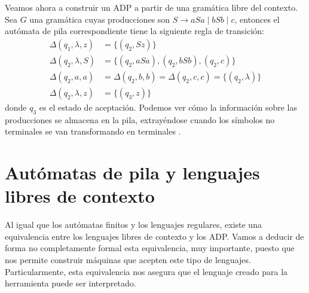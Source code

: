 \vspace{10pt}
Veamos ahora a construir un ADP a partir de una gramática libre del contexto. Sea $G$ una gramática cuyas producciones 
son $S\to aSa\mid bSb\mid c$, entonces el autómata de pila correspondiente tiene la siguiente regla de transición:
\begin{align}
    \Delta(q_1,\lambda,z)&=\{(q_2,Sz)\} \\
    \Delta(q_2,\lambda,S)&=\{(q_2,aSa),(q_2,bSb),(q_2,c)\} \\
    \Delta(q_2,a,a)&=\Delta(q_2,b,b)=\Delta(q_2,c,c)=\{(q_2,\lambda)\} \\
    \Delta(q_2,\lambda,z)&=\{(q_3,z)\}
\end{align}
donde $q_3$ es el estado de aceptación. Podemos ver cómo la información sobre las producciones se almacena en la pila,
extrayéndose cuando los símbolos no terminales se van transformando en terminales \cite{kelley_2001}.

\section{Autómatas de pila y lenguajes libres de contexto}

Al igual que los autómatas finitos y los lenguajes regulares, existe una equivalencia entre los lenguajes libres de
contexto y los ADP. Vamos a deducir de forma no completamente formal esta equivalencia, muy importante, puesto que nos
permite construir máquinas que acepten este tipo de lenguajes. Particularmente, esta equivalencia nos asegura que el
lenguaje creado para la herramienta puede ser interpretado.

